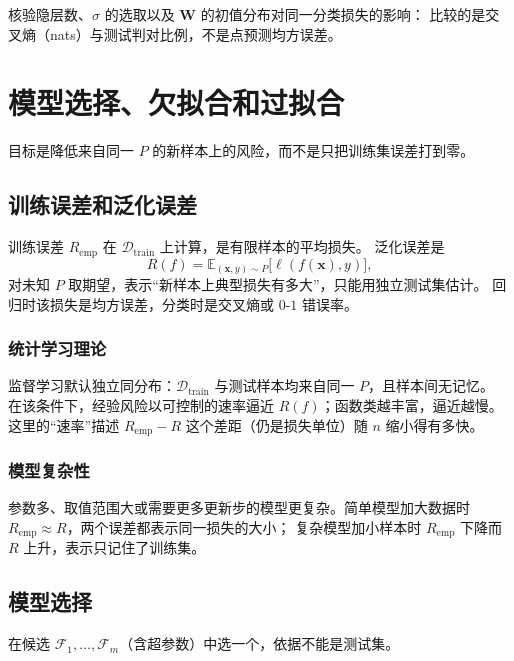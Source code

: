 核验隐层数、$\sigma$ 的选取以及 $\bm{W}$ 的初值分布对同一分类损失的影响：
比较的是交叉熵（nats）与测试判对比例，不是点预测均方误差。

\section{模型选择、欠拟合和过拟合}



目标是降低来自同一 $P$ 的新样本上的风险，而不是只把训练集误差打到零。

\subsection{训练误差和泛化误差}

训练误差 $R_{\mathrm{emp}}$ 在 $\mathcal{D}_{\mathrm{train}}$ 上计算，是有限样本的平均损失。
泛化误差是
\[
R(f)=\mathbb{E}_{(\bm{x},y)\sim P}\bigl[\ell(f(\bm{x}),y)\bigr],
\]
对未知 $P$ 取期望，表示“新样本上典型损失有多大”，只能用独立测试集估计。
回归时该损失是均方误差，分类时是交叉熵或 $0$-$1$ 错误率。

\subsubsection{统计学习理论}

监督学习默认独立同分布：$\mathcal{D}_{\mathrm{train}}$ 与测试样本均来自同一 $P$，且样本间无记忆。
在该条件下，经验风险以可控制的速率逼近 $R(f)$；函数类越丰富，逼近越慢。
这里的“速率”描述 $R_{\mathrm{emp}}-R$ 这个差距（仍是损失单位）随 $n$ 缩小得有多快。

\subsubsection{模型复杂性}

参数多、取值范围大或需要更多更新步的模型更复杂。简单模型加大数据时
$R_{\mathrm{emp}}\approx R$，两个误差都表示同一损失的大小；
复杂模型加小样本时 $R_{\mathrm{emp}}$ 下降而 $R$ 上升，表示只记住了训练集。

\subsection{模型选择}

在候选 $\mathcal{F}_{1},\ldots,\mathcal{F}_{m}$（含超参数）中选一个，依据不能是测试集。

